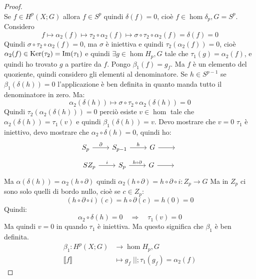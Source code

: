 \begin{proof}
\[  \]
  Se $ f \in H^p(X; G) $ allora $ f \in S^p $ quindi $ \delta(f) = 0 $, cioè $ f \in \hom{\delta_p, G} = S^p $.
  Considero
  \[
    f \mapsto \alpha_2(f) \mapsto \tau_2 \circ \alpha_2 (f) \mapsto \sigma \circ \tau_2 \circ \alpha_2 (f) = \delta(f) = 0
  \]
  Quindi $ \sigma \circ \tau_2 \circ \alpha_2 (f) = 0 $, ma $ \sigma $ è iniettiva e quindi
  $ \tau_2(\alpha_2(f)) = 0 $, cioè
  $ \alpha_2(f) \in \mathrm{Ker}( \tau_2) = \mathrm{Im}( \tau_1 ) $ e quindi
  $ \exists g \in \hom{H_p, G} $ tale che $ \tau_1(g) = \alpha_2(f) $, e quindi ho trovato
  $ g $ a partire da $ f $. Pongo $ \beta_1(f) = g_f $. Ma $ f $ è un elemento del
  quoziente, quindi considero gli elementi al denominatore.
  Se $ h \in S^{p-1} $ se $ \beta_1(\delta(h)) = 0 $ l'applicazione è ben definita in quanto
  manda tutto il denominatore in zero. Ma:
  \[
    \alpha_2(\delta(h)) \mapsto \sigma \circ \tau_2 \circ \alpha_2 (\delta(h)) = 0
  \]
  Quindi $ \tau_2(\alpha_2(\delta(h))) = 0 $ perciò esiste $ v \in \hom{} $ tale
  che $ \alpha_2(\delta(h)) = \tau_1(v) $ e quindi $ \beta_1(\delta(h)) = v $.
  Devo mostrare che $ v = 0 $
  $ \tau_1 $ è iniettivo, devo mostrare che $ \alpha_2 \circ \delta (h) = 0 $, quindi
  ho:
  \[
    \begin{tikzcd}
      S_p \rar{\partial} & S_{p-1} \rar{h} & G \rar & {}
    \end{tikzcd}
  \]
  \[
    \begin{tikzcd}
      SZ_p \rar{i} & S_{p} \rar{h \circ \partial} & G \rar & {}
    \end{tikzcd}
  \]
  Ma $ \alpha(\delta(h)) = \alpha_2(h \circ \partial) $ quindi $ \alpha_2(h \circ \partial) = h \circ \partial \circ i \colon Z_p \to G $
  Ma in $ Z_p $ ci sono solo quelli di bordo nullo, cioè se $ c \in Z_p $:
  \[
    (h \circ \partial \circ i)(c) = h \circ \partial(c) = h(0) = 0
  \]
  Quindi:
  \[
    \alpha_2 \circ \delta(h) = 0 \quad \Rightarrow \quad \tau_1(v) = 0
  \]
  Ma quindi $ v = 0 $ in quando $ \tau_1 $ è iniettiva. Ma questo significa
  che $ \beta_1 $ è ben definita.
  \begin{align*}
    \beta_1 \colon H^p(X;G) & \to \hom{H_p,G} \\
    \llbracket f \rrbracket & \mapsto g_f \; | |; \tau_1(g_f) = \alpha_2(f)
  \end{align*}


\end{proof}
